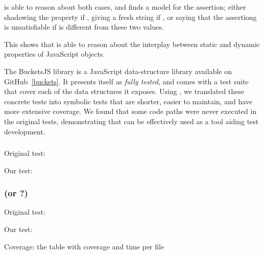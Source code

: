 \cosette is able to reason about both cases, and finds a model for the assertion; either shadowing the property if , giving a fresh string if , or saying that the assertiong is unsatisfiable if  is different from these two values.

This shows that \cosette is able to reason about the interplay between static and dynamic properties of JavaScript objects.
 

The BucketsJS library is a JavaScript data-structure library available on GitHub~\ref{buckets}.
It presents itself as \emph{fully tested}, and comes with a test suite that cover each of the data structures it exposes.
Using \cosette, we translated these concrete tests into symbolic tests that are shorter, easier to maintain, and have more extensive coverage.
We found that some code paths were never executed in the original tests, demonstrating that \cosette can be effectively used as a tool aiding test development.


\subsubsection{}
Original test:

Our test:

\subsubsection{ (or ?)}
Original test:

Our test:


Coverage: the table with coverage and time per file


